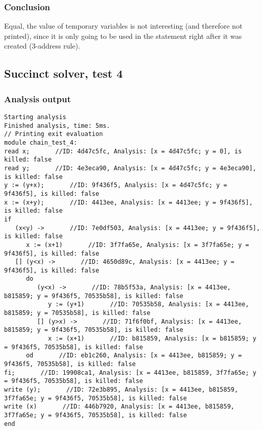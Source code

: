 \documentclass{report}
\begin{document}
\subsubsection{Conclusion}
Equal, the value of temporary variables is not interesting (and therefore not printed), since it is only going to be used in the statement right after it was created (3-address rule).

\subsection{Succinct solver, test 4}
\subsubsection{Analysis output}
\begin{lstlisting}
Starting analysis
Finished analysis, time: 5ms.
// Printing exit evaluation
module chain_test_4:
read x;       //ID: 4d47c5fc, Analysis: [x = 4d47c5fc; y = 0], is killed: false
read y;       //ID: 4e3eca90, Analysis: [x = 4d47c5fc; y = 4e3eca90], is killed: false
y := (y+x);       //ID: 9f436f5, Analysis: [x = 4d47c5fc; y = 9f436f5], is killed: false
x := (x+y);       //ID: 4413ee, Analysis: [x = 4413ee; y = 9f436f5], is killed: false
if
   (x<y) ->       //ID: 7e0df503, Analysis: [x = 4413ee; y = 9f436f5], is killed: false
      x := (x+1)       //ID: 3f7fa65e, Analysis: [x = 3f7fa65e; y = 9f436f5], is killed: false
   [] (y<x) ->       //ID: 4650d89c, Analysis: [x = 4413ee; y = 9f436f5], is killed: false
      do
         (y<x) ->       //ID: 78b5f53a, Analysis: [x = 4413ee, b815859; y = 9f436f5, 70535b58], is killed: false
            y := (y+1)       //ID: 70535b58, Analysis: [x = 4413ee, b815859; y = 70535b58], is killed: false
         [] (y>x) ->       //ID: 71f6f0bf, Analysis: [x = 4413ee, b815859; y = 9f436f5, 70535b58], is killed: false
            x := (x+1)       //ID: b815859, Analysis: [x = b815859; y = 9f436f5, 70535b58], is killed: false
      od       //ID: eb1c260, Analysis: [x = 4413ee, b815859; y = 9f436f5, 70535b58], is killed: false
fi;       //ID: 19908ca1, Analysis: [x = 4413ee, b815859, 3f7fa65e; y = 9f436f5, 70535b58], is killed: false
write (y);       //ID: 72e3b895, Analysis: [x = 4413ee, b815859, 3f7fa65e; y = 9f436f5, 70535b58], is killed: false
write (x)       //ID: 446b7920, Analysis: [x = 4413ee, b815859, 3f7fa65e; y = 9f436f5, 70535b58], is killed: false
end
\end{lstlisting}
\end{document}
